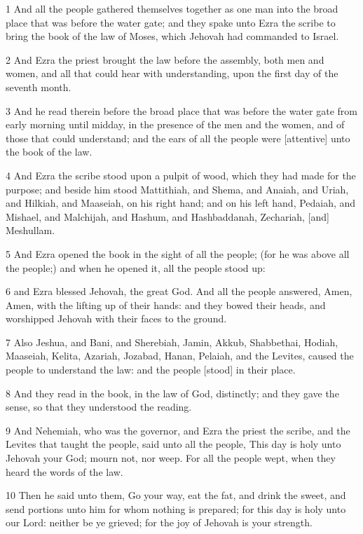 \par 1 And all the people gathered themselves together as one man into the broad place that was before the water gate; and they spake unto Ezra the scribe to bring the book of the law of Moses, which Jehovah had commanded to Israel.
\par 2 And Ezra the priest brought the law before the assembly, both men and women, and all that could hear with understanding, upon the first day of the seventh month.
\par 3 And he read therein before the broad place that was before the water gate from early morning until midday, in the presence of the men and the women, and of those that could understand; and the ears of all the people were [attentive] unto the book of the law.
\par 4 And Ezra the scribe stood upon a pulpit of wood, which they had made for the purpose; and beside him stood Mattithiah, and Shema, and Anaiah, and Uriah, and Hilkiah, and Maaseiah, on his right hand; and on his left hand, Pedaiah, and Mishael, and Malchijah, and Hashum, and Hashbaddanah, Zechariah, [and] Meshullam.
\par 5 And Ezra opened the book in the sight of all the people; (for he was above all the people;) and when he opened it, all the people stood up:
\par 6 and Ezra blessed Jehovah, the great God. And all the people answered, Amen, Amen, with the lifting up of their hands: and they bowed their heads, and worshipped Jehovah with their faces to the ground.
\par 7 Also Jeshua, and Bani, and Sherebiah, Jamin, Akkub, Shabbethai, Hodiah, Maaseiah, Kelita, Azariah, Jozabad, Hanan, Pelaiah, and the Levites, caused the people to understand the law: and the people [stood] in their place.
\par 8 And they read in the book, in the law of God, distinctly; and they gave the sense, so that they understood the reading.
\par 9 And Nehemiah, who was the governor, and Ezra the priest the scribe, and the Levites that taught the people, said unto all the people, This day is holy unto Jehovah your God; mourn not, nor weep. For all the people wept, when they heard the words of the law.
\par 10 Then he said unto them, Go your way, eat the fat, and drink the sweet, and send portions unto him for whom nothing is prepared; for this day is holy unto our Lord: neither be ye grieved; for the joy of Jehovah is your strength.

